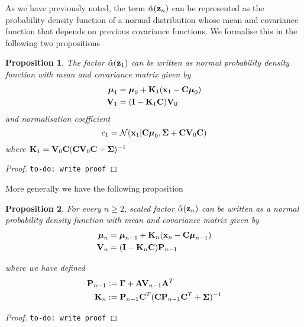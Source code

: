 \documentclass[11pt]{article}
\newtheorem{proposition}{Proposition}[section]
\begin{document}
As we have previously noted, the term $\hat\alpha({\bf z}_n)$ can be represented as the probability density function of a normal distribution whose mean and covariance function that depends on previous covariance functions. We formalise this in the following two propositions

\begin{proposition}
	The factor $\hat\alpha({\bf z}_1)$ can be written as normal probability density function with mean and covariance matrix given by
	\begin{align}
		\boldsymbol{\mu}_1 &= \boldsymbol{\mu}_0 + {\bf K}_1({\bf x}_1 -{\bf C}\boldsymbol\mu_0)\\
		{\bf V}_1 &=  ({\bf I} - {\bf K}_1{\bf C}){\bf V}_0
	\end{align}
	and normalisation coefficient
	\begin{equation}
		c_1 = \mathcal{N}({\bf x}_1\vert {\bf C}\boldsymbol\mu_0, \boldsymbol\Sigma + {\bf C} {\bf V}_0 {\bf C})
	\end{equation}
	where ${\bf K}_1 = {\bf V}_0{\bf C}({\bf C} {\bf V}_0 {\bf C} + \boldsymbol\Sigma)^{-1}$
\end{proposition}

\begin{proof}
	\texttt{to-do: write proof}
\end{proof}

More generally we have the following proposition

\begin{proposition}
	For every $n \geq 2$, scaled factor $\hat\alpha({\bf z}_n)$ can be written as a normal probability density function with mean and covariance matrix given by
	\begin{align}
		\boldsymbol{\mu}_n &= \boldsymbol{\mu}_{n-1} + {\bf K}_n({\bf x}_n -{\bf C}\boldsymbol\mu_{n-1})\\
		{\bf V}_n &=  ({\bf I} - {\bf K}_n{\bf C}){\bf P}_{n-1}
	\end{align}
	
	where we have defined
	\begin{align}
		{\bf P}_{n-1} &:= \boldsymbol{\Gamma} + {\bf A}{\bf V}_{n-1}{\bf A}^T\\
		{\bf K}_n &:= {\bf P}_{n-1}{\bf C}^T({\bf C} {\bf P}_{n-1}{\bf C}^T + \boldsymbol\Sigma)^{-1}
	\end{align}
\end{proposition}

\begin{proof}
	\texttt{to-do: write proof}
\end{proof}
\end{document}
